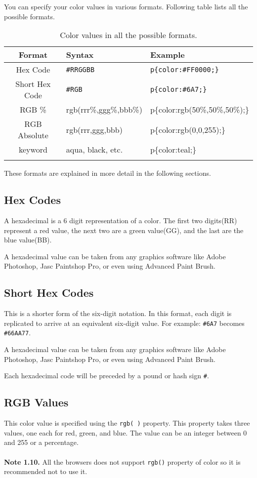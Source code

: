 \documentclass[a4paper,oneside]{book}
\numberwithin{equation}{chapter}
\begin{document}
You can specify your color values in various formats. Following table lists all the possible formats.
\begin{center}
\begin{longtable}{|c|l|l|}
\hline
\textbf{Format} & \textbf{Syntax} & \textbf{Example}\\
\hline
Hex Code & \verb|#RRGGBB| & \verb|p{color:#FF0000;}|\\
\hline
Short Hex Code & \verb|#RGB| & \verb|p{color:#6A7;}|\\
\hline
RGB \% & rgb(rrr\%,ggg\%,bbb\%) & p\{color:rgb(50\%,50\%,50\%);\}\\
\hline
RGB Absolute & rgb(rrr,ggg,bbb) & p\{color:rgb(0,0,255);\}\\
\hline
keyword & aqua, black, etc. & p\{color:teal;\}\\
\hline
\caption{Color values in all the possible formats.} 
\end{longtable}
\end{center}
These formats are explained in more detail in the following sections.
\subsection{Hex Codes}
A hexadecimal is a 6 digit representation of a color. The first two digits(RR) represent a red value, the next two are a green value(GG), and the last are the blue value(BB).

A hexadecimal value can be taken from any graphics software like Adobe Photoshop, Jasc Paintshop Pro, or even using Advanced Paint Brush.
\subsection{Short Hex Codes}
This is a shorter form of the six-digit notation. In this format, each digit is replicated to arrive at an equivalent six-digit value. For example: \verb|#6A7| becomes \verb|#66AA77|.

A hexadecimal value can be taken from any graphics software like Adobe Photoshop, Jasc Paintshop Pro, or even using Advanced Paint Brush.

Each hexadecimal code will be preceded by a pound or hash sign \verb|#|.
\subsection{RGB Values}
This color value is specified using the \verb|rgb( )| property. This property takes three values, one each for red, green, and blue. The value can be an integer between 0 and 255 or a percentage.\\
\\
\textbf{Note 1.10.} All the browsers does not support \verb|rgb()| property of color so it is recommended not to use it.
\end{document}
